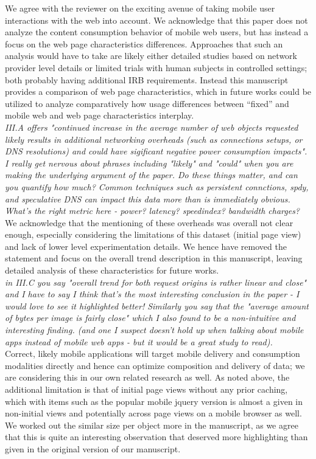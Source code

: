 \documentclass[11pt, draftclsnofoot, onecolumn]{IEEEtran}
\begin{document}
{{We agree with the reviewer on the exciting avenue of taking mobile user interactions with the web into account.
We acknowledge that this paper does not analyze the content consumption behavior of mobile web users, but has instead a focus on the web page characteristics differences. Approaches that such an analysis would have to take are likely either detailed studies based on network provider level details or limited trials with human subjects in controlled settings; both probably having additional IRB requirements. 
Instead this manuscript provides a comparison of web page characteristics, which in future works could be utilized to analyze comparatively how usage differences between ``fixed'' and mobile web and web page characteristics interplay.
\\

\noindent \textit{III.A offers "continued increase in the average number of web objects requested likely results in additional networking overheads (such as connections setups, or DNS resolutions) and could have sigificant negative power consumption impacts". I really get nervous about phrases including "likely" and "could" when you are making the underlying argument of the paper. Do these things matter, and can you quantify how much? Common techniques such as persistent connctions, spdy, and speculative DNS can impact this data more than is immediately obvious. What's the right metric here - power? latency? speedindex? bandwidth charges?}\\
We acknowledge that the mentioning of these overheads was overall not clear enough, especially considering the limitations of this dataset (initial page view) and lack of lower level experimentation details. We hence have removed the statement and focus on the overall trend description in this manuscript, leaving detailed analysis of these characteristics for future works.\\


\noindent \textit{in III.C you say "overall trend for both request origins is rather linear and close" and I have to say I think that's the most interesting conclusion in the paper - I would love to see it highlighted better! Similarly you say that the "average amount of bytes per image is fairly close" which I also found to be a non-intuitive and interesting finding. (and one I suspect doesn't hold up when talking about mobile apps instead of mobile web apps - but it would be a great study to read).}\\
Correct, likely mobile applications will target mobile delivery and consumption modalities directly and hence can optimize composition and delivery of data; we are considering this in our own related research as well. As noted above, the additional limitation is that of initial page views without any prior caching, which with items such as the popular mobile jquery version is almost a given in non-initial views and potentially across page views on a mobile browser as well.
We worked out the similar size per object more in the manuscript, as we agree that this is quite an interesting observation that deserved more highlighting than given in the original version of our manuscript.\\


}}
\end{document}
